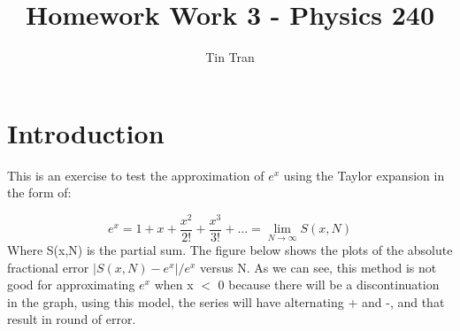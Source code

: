 \documentclass{article}
\begin{document}
\title{Homework Work 3 - Physics 240}
\author{Tin Tran}

\maketitle

\section{Introduction}

This is an exercise to test the approximation of $e^x$ using the Taylor expansion in the form of: \newline

\begin{equation}\label{eqn:epi}e^x = 1 + x + \frac{x^2}{2!} + \frac{x^3}{3!} + ... = \lim_{N \to \infty} S(x,N)
\end{equation} \newline
Where S(x,N) is the partial sum. The figure below shows the plots of the absolute fractional error $|S(x,N)-e^x|/e^x$ versus N. As we can see, this method is not good for approximating $e^x$ when x $<$ 0 because there will be a discontinuation in the graph, using this model, the series will have alternating + and -, and that result in round of error.


\begin{figure}[H]
\end{figure}
\end{document}
